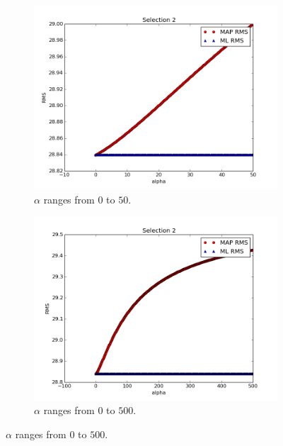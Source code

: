 \documentclass[a4paper]{article}
\begin{document}
\begin{figure}[H]
  \begin{adjustwidth}{-7em}{-7em}
    \centering
    \begin{subfigure}{.32\linewidth}
      \includegraphics[width=\linewidth]{figures/alpha_vs_rms_selection2a.png}
      \caption{$\alpha$ ranges from $0$ to $50$.}
      \label{fig:alpha_vs_rms_selection2a}
    \end{subfigure}
    \begin{subfigure}{.32\linewidth}
      \includegraphics[width=\linewidth]{figures/alpha_vs_rms_selection2b.png}
      \caption{$\alpha$ ranges from $0$ to $500$.}
      \label{fig:alpha_vs_rms_selection2b}
    \end{subfigure}

\end{adjustwidth}
\end{figure}
\end{document}
